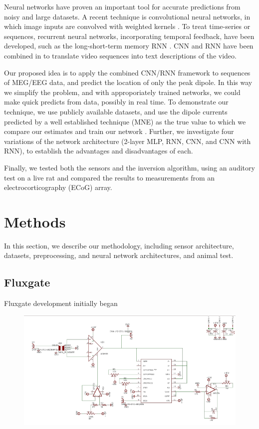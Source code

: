\documentclass[journal,12pt,onecolumn,draftclsnofoot]{IEEEtran}
\begin{document}
Neural networks have proven an important tool for accurate predictions from noisy and large datasets. A recent technique is convolutional neural networks, in which image inputs are convolved with weighted kernels \cite{lecun1998gradient}. To treat time-series or sequences, recurrent neural networks, incorporating temporal feedback, have been developed, such as the long-short-term memory RNN \cite{hochreiter1997long}. CNN and RNN have been combined in \cite{venugopalan2014translating} to translate video sequences into text descriptions of the video.


Our proposed idea is to apply the combined CNN/RNN framework to sequences of MEG/EEG data, and predict the location of only the peak dipole. In this way we simplify the problem, and with approporiately trained networks, we could make quick predicts from data, possibly in real time. To demonstrate our technique, we use publicly available datasets, and use the dipole currents predicted by a well established technique (MNE) as the true value to which we compare our estimates and train our network \cite{gramfort2014mne}. Further, we investigate four variations of the network architecture (2-layer MLP, RNN, CNN, and CNN with RNN), to establish the advantages and disadvantages of each.

Finally, we tested both the sensors and the inversion algorithm, using an auditory test on a live rat and compared the results to measurements from an electrocorticography (ECoG) array.

\section{Methods}

In this section, we describe our methodology, including sensor architecture, datasets, preprocessing, and neural network architectures, and animal test.

\subsection{Fluxgate}

Fluxgate development initially began

\begin{figure}[h!]
\centering
\includegraphics[width=5in]{finalplots/coil_preamp}
\caption{}
\label{fig:coil_preamp}
\end{figure}
\end{document}
